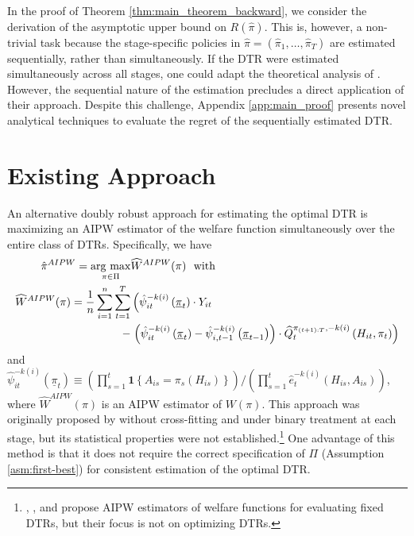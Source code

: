 In the proof of Theorem \ref{thm:main_theorem_backward}, we consider the derivation of the asymptotic upper bound on $R(\hat{\pi})$. This is, however, a non-trivial task because the stage-specific policies in $\hat{\pi} = (\hat{\pi}_1, \ldots, \hat{\pi}_T)$ are estimated sequentially, rather than simultaneously. If the DTR were estimated simultaneously across all stages, one could adapt the theoretical analysis of \citet{zhou2022offline}. However, the sequential nature of the estimation precludes a direct application of their approach. Despite this challenge, Appendix \ref{app:main_proof} presents novel analytical techniques to evaluate the regret of the sequentially estimated DTR.



\section{Existing Approach}\label{sec:existing_approach}

An alternative doubly robust approach for estimating the optimal DTR is maximizing an AIPW estimator of the welfare function simultaneously over the entire class of DTRs.  Specifically, we have 
\begin{align}
    \hat{\pi}^{AIPW} = \mathop{\rm arg~max}\limits_{\pi \in \Pi} & \widehat{W}^{AIPW}(\pi) \mbox{\ \ with} \label{eq:simultaneous_maximization}\\
    \widehat{W}^{AIPW}(\pi) = \frac{1}{n}\sum_{i=1}^{n}\sum_{t=1}^{T}&\left(\hat{\psi}_{it}^{-k(i)}\left(\underline{\pi}_{t}\right)\cdot Y_{it} \right. \nonumber \\
      - &\left.\left(\hat{\psi}_{it}^{-k(i)}\left(\underline{\pi}_{t}\right)- \hat{\psi}_{i,t-1}^{-k(i)}\left(\underline{\pi}_{t-1}\right)\right)\cdot \widehat{Q}_{t}^{\pi_{(t+1):T},-k(i)}\left(H_{it},\pi_t\right)\right) \nonumber
\end{align}
and $\hat{\psi}_{it}^{-k(i)}(\underline{\pi}_{t}) \equiv \left(\prod_{s=1}^{t}\mathbf{1}\left\{ A_{is}=\pi_{s}(H_{is})\right\}\right)/(\prod_{s=1}^{t}\hat{e}_{t}^{-k(i)}\left(H_{is},A_{is}\right))$, where $\widehat{W}^{AIPW}(\pi)$ is an AIPW estimator of $W(\pi)$. This approach was originally proposed by \citet{Zhang_et_2013} without cross-fitting and under binary treatment at each stage, but its statistical properties were not established.\footnote{\cite{Jiang_Li_2016}, \cite{Thomas_et_al_2016}, and \cite{Kallus_Uehara_2020} propose AIPW estimators of welfare functions for evaluating fixed DTRs, but their focus is not on optimizing DTRs.}
One advantage of this method is that it does not require the correct specification of $\Pi$ (Assumption \ref{asm:first-best}) for consistent estimation of the optimal DTR.

